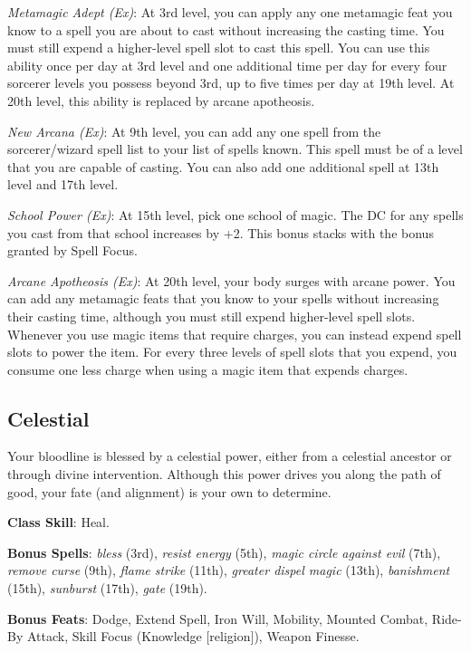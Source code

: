 \textit{Metamagic Adept (Ex)}: At 3rd level, you can apply any one metamagic feat you know to a spell you are about to cast without increasing the casting time. You must still expend a higher-level spell slot to cast this spell. You can use this ability once per day at 3rd level and one additional time per day for every four sorcerer levels you possess beyond 3rd, up to five times per day at 19th level. At 20th level, this ability is replaced by arcane apotheosis.
				
\textit{New Arcana (Ex)}: At 9th level, you can add any one spell from the sorcerer/wizard spell list to your list of spells known. This spell must be of a level that you are capable of casting. You can also add one additional spell at 13th level and 17th level.
				
\textit{School Power (Ex)}: At 15th level, pick one school of magic. The DC for any spells you cast from that school increases by +2. This bonus stacks with the bonus granted by Spell Focus.
				
\textit{Arcane Apotheosis (Ex)}: At 20th level, your body surges with arcane power. You can add any metamagic feats that you know to your spells without increasing their casting time, although you must still expend higher-level spell slots. Whenever you use magic items that require charges, you can instead expend spell slots to power the item. For every three levels of spell slots that you expend, you consume one less charge when using a magic item that expends charges.
				
\subsection{Celestial}

				
Your bloodline is blessed by a celestial power, either from a celestial ancestor or through divine intervention. Although this power drives you along the path of good, your fate (and alignment) is your own to determine.
				
\textbf{Class Skill}: Heal.
				
\textbf{Bonus Spells}: \textit{bless} (3rd), \textit{resist energy }(5th), \textit{magic circle against evil} (7th), \textit{remove curse} (9th),\textit{ flame strike} (11th), \textit{greater dispel magic} (13th), \textit{banishment} (15th), \textit{sunburst} (17th),\textit{ gate }(19th).
				
\textbf{Bonus Feats}: Dodge, Extend Spell, Iron Will, Mobility, Mounted Combat, Ride-By Attack, Skill Focus (Knowledge \mbox{$[$}religion\mbox{$]$}), Weapon Finesse.
				
